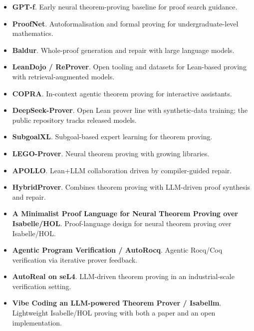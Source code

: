 \documentclass[natbib=false,acmsmall,nonacm,11pt]{acmart}
\begin{document}
\begin{itemize}
\item \textbf{GPT-f}. Early neural theorem-proving baseline for proof search guidance.~\cite{DBLP:journals/corr/abs-2009-03393}
\item \textbf{ProofNet}. Autoformalisation and formal proving for undergraduate-level mathematics.~\cite{DBLP:journals/corr/abs-2302-12433}
\item \textbf{Baldur}. Whole-proof generation and repair with large language models.~\cite{DBLP:conf/sigsoft/FirstRRB23}
\item \textbf{LeanDojo / ReProver}. Open tooling and datasets for Lean-based proving with retrieval-augmented models.~\cite{DBLP:journals/corr/abs-2306-15626}
\item \textbf{COPRA}. In-context agentic theorem proving for interactive assistants.~\cite{DBLP:journals/corr/abs-2310-04353}
\item \textbf{DeepSeek-Prover}. Open Lean prover line with synthetic-data training; the public repository tracks released models.~\cite{DBLP:journals/corr/abs-2405-14333,deepseek_prover_v15_repo}
\item \textbf{SubgoalXL}. Subgoal-based expert learning for theorem proving.~\cite{DBLP:journals/corr/abs-2408-11172}
\item \textbf{LEGO-Prover}. Neural theorem proving with growing libraries.~\cite{DBLP:journals/corr/abs-2310-00656}
\item \textbf{APOLLO}. Lean+LLM collaboration driven by compiler-guided repair.~\cite{DBLP:journals/corr/abs-2505-05758}
\item \textbf{HybridProver}. Combines theorem proving with LLM-driven proof synthesis and repair.~\cite{DBLP:journals/corr/abs-2505-15740}
\item \textbf{A Minimalist Proof Language for Neural Theorem Proving over Isabelle/HOL}. Proof-language design for neural theorem proving over Isabelle/HOL.~\cite{xu2025minimalistprooflanguageneural}
\item \textbf{Agentic Program Verification / AutoRocq}. Agentic Rocq/Coq verification via iterative prover feedback.~\cite{DBLP:journals/corr/abs-2511-17330}
\item \textbf{AutoReal on seL4}. LLM-driven theorem proving in an industrial-scale verification setting.~\cite{DBLP:journals/corr/abs-2602-08384}
\item \textbf{Vibe Coding an LLM-powered Theorem Prover / Isabellm}. Lightweight Isabelle/HOL proving with both a paper and an open implementation.~\cite{DBLP:journals/corr/abs-2601-04653,llm_isabelle_repo}

\end{itemize}
\end{document}
